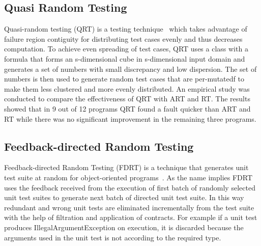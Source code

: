 \subsection{Quasi Random Testing}
Quasi-random testing (QRT) is a testing technique~\cite{chen2007quasi} which takes advantage of failure region contiguity for distributing test cases evenly and thus decreases computation. %
To achieve even spreading of test cases, QRT uses a class with a formula that forms an s-dimensional cube in s-dimensional input domain and generates a set of numbers with small discrepancy and low dispersion. The set of numbers is then used to generate random test cases that are per-mutatedf to make them less clustered and more evenly distributed. An empirical study was conducted to compare the effectiveness of QRT with ART and RT. The results showed that in 9 out of 12 programs QRT found a fault quicker than ART and RT while there was no significant improvement in the remaining three programs.


\subsection{Feedback-directed Random Testing}
Feedback-directed Random Testing (FDRT) is a technique that generates unit test suite at random for object-oriented programs~\cite{pacheco2007randoop}. As the name implies FDRT uses the feedback received from the execution of first batch of randomly selected unit test suites to generate next batch of directed unit test suite. In this way redundant  and wrong unit tests are eliminated incrementally from the test suite with the help of filtration and application of contracts. For example if a unit test produces IllegalArgumentException on execution, it is discarded because the arguments used in the unit test is not according to the required type. 

